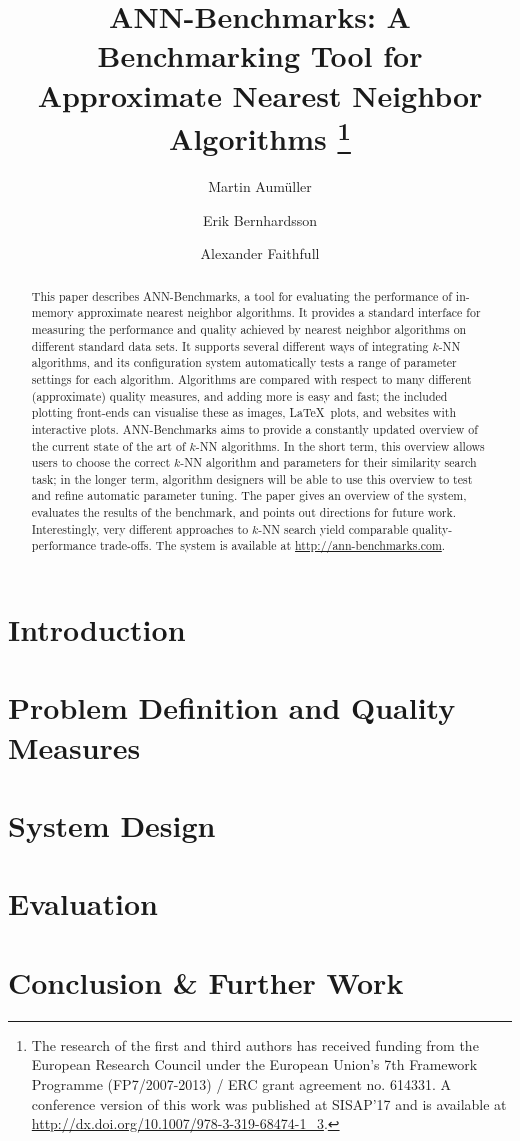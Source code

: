 \documentclass[a4paper,english]{lipics-v2018}
\title{ANN-Benchmarks: A Benchmarking Tool for Approximate Nearest Neighbor Algorithms%
\footnote{The research of the first and third authors has received funding from the European Research Council under the European Union's 7th Framework Programme (FP7/2007-2013) / ERC grant agreement no. 614331.
A conference version of this work was published at SISAP'17 and is available at \url{http://dx.doi.org/10.1007/978-3-319-68474-1_3}.}
}
\author{Martin Aum\"{u}ller}{IT University of Copenhagen, Denmark}{maau@itu.dk}{}{}
\author{Erik Bernhardsson}{Better, Inc.}{mail@erikbern.com}{}{}
\author{Alexander Faithfull}{IT University of Copenhagen, Denmark}{alef@itu.dk}{}{}
\begin{document}
\maketitle
\begin{abstract}
    This paper describes \textsf{ANN-Benchmarks}, a tool for evaluating
    the performance of in-memory approximate nearest neighbor algorithms. It
    provides
    a standard interface for measuring the performance and quality achieved by nearest neighbor
    algorithms on different standard data sets. It
    supports several different ways of integrating $k$-NN algorithms, and
    its configuration system automatically tests a range of parameter settings
    for each algorithm.
    Algorithms are compared with respect to many different (approximate)
    quality
    measures, and adding more is easy and fast;
    the included plotting front-ends can visualise these as images, \LaTeX\
    plots, and websites with interactive plots.
    \textsf{ANN-Benchmarks} aims to provide a constantly updated overview of
    the current state of the art of $k$-NN algorithms.
    In the short term, this overview allows users to 
  	choose the correct $k$-NN algorithm and parameters for their similarity
  	search task;
	  in the longer term, algorithm designers will be able to use this overview
	  to test and refine automatic parameter tuning.
	The paper gives an overview of
    the system, evaluates the results of the benchmark,
    and points out directions for future work. Interestingly, very different approaches
	to $k$-NN search yield comparable quality-performance trade-offs. 
    The system is available at \url{http://ann-benchmarks.com}.
\end{abstract}



\section{Introduction}\label{sec:introduction}

\section{Problem Definition and Quality Measures}\label{sec:problem:desc}

\section{System Design}\label{sec:system:design}

\section{Evaluation}\label{sec:evaluation}

\section{Conclusion \& Further Work}\label{sec:conclusion}



\end{document}
